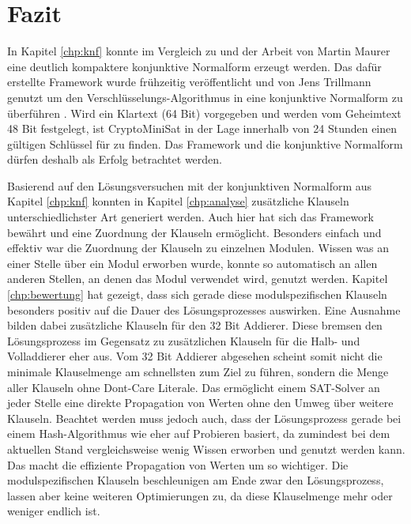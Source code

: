 \chapter{Fazit}
\label{chp:fazit}

In Kapitel \ref{chp:knf} konnte im Vergleich zu  und der Arbeit von Martin Maurer eine deutlich kompaktere konjunktive Normalform erzeugt werden.
Das dafür erstellte Framework wurde frühzeitig veröffentlicht und von Jens Trillmann genutzt um den Verschlüsselungs-Algorithmus  in eine
konjunktive Normalform zu überführen \cite{trillmann}. Wird ein Klartext (64 Bit) vorgegeben und werden vom Geheimtext 48 Bit festgelegt, ist CryptoMiniSat
in der Lage innerhalb von 24 Stunden einen gültigen Schlüssel für  zu finden. Das Framework und die konjunktive Normalform dürfen deshalb als
Erfolg betrachtet werden.

Basierend auf den Lösungsversuchen mit der konjunktiven Normalform aus Kapitel \ref{chp:knf} konnten in Kapitel \ref{chp:analyse} zusätzliche Klauseln
unterschiedlichster Art generiert werden. Auch hier hat sich das Framework bewährt und eine Zuordnung der Klauseln ermöglicht. Besonders einfach und
effektiv war die Zuordnung der Klauseln zu einzelnen Modulen. Wissen was an einer Stelle über ein Modul erworben wurde, konnte so automatisch an allen
anderen Stellen, an denen das Modul verwendet wird, genutzt werden. Kapitel \ref{chp:bewertung} hat gezeigt, dass sich gerade diese modulspezifischen
Klauseln besonders positiv auf die Dauer des Lösungsprozesses auswirken. Eine Ausnahme bilden dabei zusätzliche Klauseln für den 32 Bit Addierer. Diese
bremsen den Lösungsprozess im Gegensatz zu zusätzlichen Klauseln für die Halb- und Volladdierer eher aus. Vom 32 Bit Addierer abgesehen scheint somit
nicht die minimale Klauselmenge am schnellsten zum Ziel zu führen, sondern die Menge aller Klauseln ohne Dont-Care Literale. Das ermöglicht einem
SAT-Solver an jeder Stelle eine direkte Propagation von Werten ohne den Umweg über weitere Klauseln. Beachtet werden muss jedoch auch, dass der
Lösungsprozess gerade bei einem Hash-Algorithmus wie  eher auf Probieren basiert, da zumindest bei dem aktuellen Stand vergleichsweise
wenig Wissen erworben und genutzt werden kann. Das macht die effiziente Propagation von Werten um so wichtiger. Die modulspezifischen Klauseln
beschleunigen am Ende zwar den Lösungsprozess, lassen aber keine weiteren Optimierungen zu, da diese Klauselmenge mehr oder weniger endlich ist.

